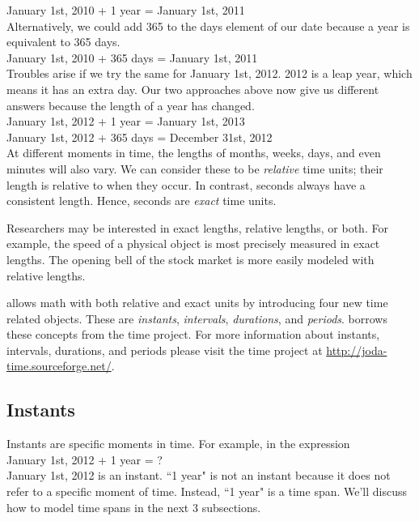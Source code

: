 \documentclass[article]{jss}
\begin{document}
January 1st, 2010 + 1 year = January 1st, 2011\\

Alternatively, we could add 365 to the days element of our date because a year is equivalent to 365 days. \\

January 1st, 2010 + 365 days = January 1st, 2011\\

Troubles arise if we try the same for January 1st, 2012. 2012 is a leap year, which means it has an extra day. Our two approaches above now give us different answers because the length of a year has changed.\\ 

January 1st, 2012 + 1 year = January 1st, 2013\\
January 1st, 2012 + 365 days = December 31st,  2012\\

At different moments in time, the lengths of months, weeks, days, and even minutes will also vary. We can consider these to be \emph{relative} time units; their length is relative to when they occur. In contrast, seconds always have a consistent length. Hence, seconds are \emph{exact} time units.

Researchers may be interested in exact lengths, relative lengths, or both. For example, the speed of a physical object is most precisely measured in exact lengths. The opening bell of the stock market is more easily modeled with relative lengths.

 allows math with both relative and exact units by introducing four new time related objects. These are \emph{instants}, \emph{intervals}, \emph{durations}, and \emph{periods}.   borrows these concepts from the  time project. For more information about instants, intervals, durations, and periods please visit the  time project at  \url{http://joda-time.sourceforge.net/}. 

\subsection{Instants}
\label{sec:instants}

Instants are specific moments in time.  For example, in the expression\\

January 1st, 2012 + 1 year = ?\\

January 1st, 2012 is an instant. ``1 year" is not an instant because it does not refer to a specific moment of time. Instead, ``1 year" is a time span. We'll discuss how to model time spans in the next 3 subsections.
\end{document}
